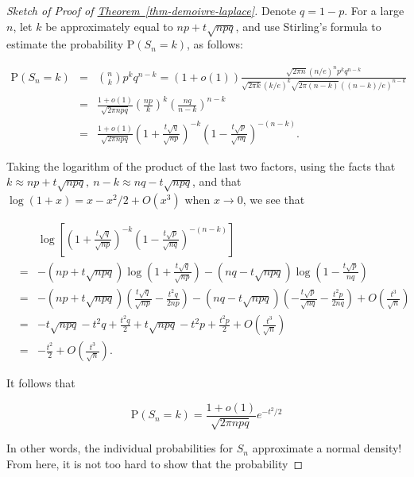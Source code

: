 \begin{proof}[Sketch of Proof of \texorpdfstring{\hyperref[thm-demoivre-laplace]{Theorem~\ref*{thm-demoivre-laplace}}}{Theorem}]
Denote $q=1-p$. For a large $n$, let $k$ be
approximately equal to $np+t\sqrt{npq}$, and use
Stirling's formula to estimate the probability
$\mathrm{P}(S_n=k)$, as follows:

\begin{eqnarray*}
\mathrm{P}(S_n = k) &=& \binom{n}{k} p^k q^{n-k} = (1+o(1)) \frac{\sqrt{2\pi n} (n/e)^n p^k q^{n-k}}{ \sqrt{2\pi k} (k/e)^k \sqrt{2\pi (n-k)} ((n-k)/e)^{n-k}} \\
&=&  \frac{1+o(1)}{\sqrt{2\pi n p q}} \left(\frac{np}{k}\right)^k \left( \frac{nq}{n-k}\right)^{n-k} \\
&=& \frac{1+o(1)}{\sqrt{2\pi n p q}} \left(1+\frac{t\sqrt{q}}{\sqrt{np}}\right)^{-k} \left(1- \frac{t\sqrt{p}}{\sqrt{nq}}\right)^{-(n-k)}.
\end{eqnarray*}

\noindent Taking the logarithm of the product of the last two
factors, using the facts that
$k\approx np+t\sqrt{npq},\ n-k\approx nq-t\sqrt{npq}$,
and that $\log(1+x)=x-x^2/2+O(x^3)$ when $x\to0$, we
see that

\begin{eqnarray*}
&&\log\left[\left(1+\frac{t\sqrt{q}}{\sqrt{np}}\right)^{-k} \left(1- \frac{t\sqrt{p}}{\sqrt{nq}}\right)^{-(n-k)}\right] \\
&=& -(np+t\sqrt{npq}) \log\left(1+\frac{t\sqrt{q}}{\sqrt{np}} \right)
- (nq-t\sqrt{npq}) \log\left(1-\frac{t\sqrt{p}}{nq}\right) \\
&=& -(np+t\sqrt{npq}) \left(\frac{t\sqrt{q}}{\sqrt{np}}-\frac{t^2 q}{2np} \right)
- (nq-t\sqrt{npq}) \left( -\frac{t\sqrt{p}}{\sqrt{nq}} - \frac{t^2 p}{2nq} \right) + O\left(\frac{t^3}{\sqrt{n}}\right) \\
&=& -t\sqrt{npq}  -t^2q + \frac{t^2 q}{2} + t \sqrt{npq} - t^2 p + \frac{t^2 p}{2} + O\left(\frac{t^3}{\sqrt{n}}\right) \\
&=& -\frac{t^2}{2} + O\left(\frac{t^3}{\sqrt{n}}\right).
\end{eqnarray*}

\noindent It follows that

\[
\mathrm{P}(S_n = k) = \frac{1+o(1)}{\sqrt{2\pi n p q}} e^{-t^2/2}
\]

\noindent In other words, the individual probabilities for $S_n$
approximate a normal density! From here, it is not too
hard to show that the probability


\end{proof}
